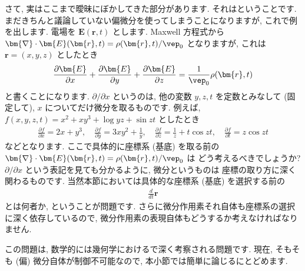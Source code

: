 \documentclass[openany, a4paper, oneside]{jsbook}
\begin{document}
さて, 実はここまで曖昧にぼかしてきた部分があります.
それはということです.
まだきちんと議論していない偏微分を使ってしまうことになりますが,
これで例を出します.
電場を $\bm{E}(\bm{r}, t)$ とします.
Maxwell 方程式から $\bm{ \nabla } \cdot \bm{E}( \bm{r} , t ) = \rho ( \bm{r} , t ) / \vep_0$ となりますが,
これは $\bm{r} = (x ,y , z)$ としたとき
\begin{gather}
 \frac{ \partial \bm{E} } { \partial x } + \frac{ \partial \bm{E} } { \partial y }
  +\frac{ \partial \bm{E} } { \partial z }
 =
 \frac{1} { \vep _0 } \rho ( \bm{r} , t )
\end{gather}
と書くことになります.
$\partial / \partial x$ というのは,
他の変数 $y,z,t$ を定数とみなして (固定して),
$x$ についてだけ微分を取るものです.
例えば, $f (x, y ,z , t) = x^2 + x y^3 +  \log y z + \sin z t$ としたとき
\begin{gather}
    \frac{ \partial f } { \partial x }
    =
    2 x + y^3 ,\quad
    \frac{ \partial f } { \partial y }
    =
    3x y^2 + \frac{1} {y} ,\quad
    \frac{ \partial f } { \partial z }
    =
    \frac{1} {z} + t \cos z t ,\quad
    \frac{ \partial f } { \partial t }
    =
    z \cos z t
\end{gather}
などとなります.
ここで具体的に座標系 (基底) を取る前の $\bm{ \nabla } \cdot \bm{E}( \bm{r} , t ) = \rho ( \bm{r} , t ) / \vep_0$ は
どう考えるべきでしょうか?
$\partial / \partial x$ という表記を見ても分かるように, 微分というものは
座標の取り方に深く関わるものです.
当然本節においては具体的な座標系 (基底) を選択する前の
\begin{gather}
    \frac{d} {dt} \bm{r}
\end{gather}
とは何者か, ということが問題です.
さらに微分作用素それ自体も座標系の選択に深く依存しているので,
微分作用素の表現自体もどうするか考えなければなりません.

この問題は, 数学的には幾何学におけるで深く考察される問題です.
現在, そもそも (偏) 微分自体が制御不可能なので, 本小節では簡単に論じるにとどめます.
\end{document}
